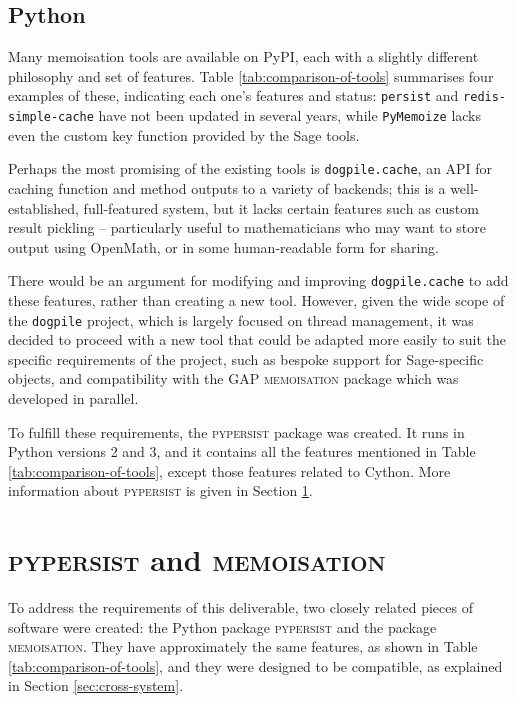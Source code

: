 \documentclass{deliverablereport}
\newcommand{\pypersist}{\textsc{pypersist}}
\newcommand{\Memoisation}{\textsc{memoisation}}
\begin{document}
\subsection{Python}
Many memoisation tools are available on PyPI, each with a slightly different
philosophy and set of features.  Table \ref{tab:comparison-of-tools} summarises
four examples of these, indicating each one's features and status:
\texttt{persist} and \texttt{redis-simple-cache} have not been updated in
several years, while \texttt{PyMemoize} lacks even the custom key function
provided by the Sage tools.

Perhaps the most promising of the existing tools is \texttt{dogpile.cache}, an
API for caching function and method outputs to a variety of backends; this is a
well-established, full-featured system, but it lacks certain features such as
custom result pickling -- particularly useful to mathematicians who may want to
store output using OpenMath, or in some human-readable form for sharing.

There would be an argument for modifying and improving \texttt{dogpile.cache} to
add these features, rather than creating a new tool.  However, given the wide
scope of the \texttt{dogpile} project, which is largely focused on thread
management, it was decided to proceed with a new tool that could be adapted more
easily to suit the specific requirements of the project, such as bespoke support
for Sage-specific objects, and compatibility with the GAP \Memoisation{} package
which was developed in parallel.

To fulfill these requirements, the \pypersist{} package was created.  It runs in
Python versions 2 and 3, and it contains all the features mentioned in Table
\ref{tab:comparison-of-tools}, except those features related to Cython.  More
information about \pypersist{} is given in Section \ref{sec:pypersist}.

\section{\pypersist{} and \Memoisation{}}
\label{sec:pypersist}

To address the requirements of this deliverable, two closely related pieces of
software were created: the Python package \pypersist{} and the \GAP package
\Memoisation{}.  They have approximately the same features, as shown in Table
\ref{tab:comparison-of-tools}, and they were designed to be compatible, as
explained in Section \ref{sec:cross-system}.
\end{document}
